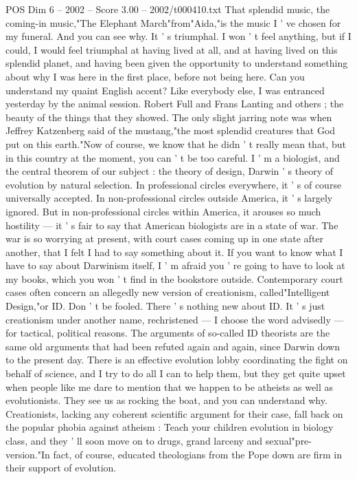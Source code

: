 \begin{textsample}{POS Dim 6 – 2002 – Score 3.00 – 2002/t000410.txt}  \label{ex:f6_pos_007}
That splendid music, the coming-in music,"The Elephant March"from"Aida,"is the music I ' ve chosen for my funeral.
And you can see why.
It ' s triumphal.
I won ' t feel anything, but if I could, I would feel triumphal at having lived at all, and at having lived on this splendid planet, and having been given the opportunity to understand something about why I was here in the first place, before not being here.
Can you understand my quaint English accent?
Like everybody else, I was entranced yesterday by the animal session.
Robert Full and Frans Lanting and others ; the beauty of the things that they showed.
The only slight jarring note was when Jeffrey Katzenberg said of the mustang,"the most splendid creatures that God put on this earth."Now of course, we know that he didn ' t really mean that, but in this country at the moment, you can ' t be too careful.
I ' m a biologist, and the central theorem of our subject : the theory of design, Darwin ' s theory of evolution by natural selection.
In professional circles everywhere, it ' s of course universally accepted.
In non-professional circles outside America, it ' s largely ignored.
But in non-professional circles within America, it arouses so much hostility — it ' s fair to say that American biologists are in a state of war.
The war is so worrying at present, with court cases coming up in one state after another, that I felt I had to say something about it.
If you want to know what I have to say about Darwinism itself, I ' m afraid you ' re going to have to look at my books, which you won ' t find in the bookstore outside.
Contemporary court cases often concern an allegedly new version of creationism, called"Intelligent Design,"or ID.
Don ' t be fooled.
There ' s nothing new about ID.
It ' s just creationism under another name, rechristened — I choose the word advisedly — for tactical, political reasons.
The arguments of so-called ID theorists are the same old arguments that had been refuted again and again, since Darwin down to the present day.
There is an effective evolution lobby coordinating the fight on behalf of science, and I try to do all I can to help them, but they get quite upset when people like me dare to mention that we happen to be atheists as well as evolutionists.
They see us as rocking the boat, and you can understand why.
Creationists, lacking any coherent scientific argument for their case, fall back on the popular phobia against atheism : Teach your children evolution in biology class, and they ' ll soon move on to drugs, grand larceny and sexual"pre-version."In fact, of course, educated theologians from the Pope down are firm in their support of evolution.

\end{textsample}
